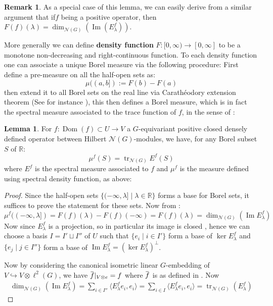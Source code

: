 \documentclass[11pt]{report}
\theoremstyle{definition}
\newtheorem{Lemma}[Def]{Lemma}
\newtheorem{Rmk}{Remark}[chapter]
\theoremstyle{plain}
\DeclareMathOperator{\tr}{tr}
\DeclareMathOperator{\im}{Im}
\DeclareMathOperator{\dom}{Dom}
\newcommand{\real}{\mathbb{R}}
\newcommand{\inj}{\hookrightarrow}
\newcommand{\vna}{\mathcal{N}}
\newcommand{\overbar}[1]{\mkern 1.5mu\overline{\mkern-1.5mu#1\mkern-1.5mu}\mkern 1.5mu}
\newcommand{\brac}[1]{\langle #1 \rangle}
\renewcommand{\bar}{\overbar}
\begin{document}
\begin{Rmk}
	As a special case of this lemma, we can easily derive from a similar argument that if$f$ being a positive operator, then $F(f)(\lambda)=\dim_{\vna(G)}(\im (E^{f}_{\lambda}))$.
\end{Rmk}
More generally we can define \textbf{density function} $F:[0, \infty)\to [0, \infty]$ to be a monotone non-decreasing and right-continuous function. To each density function one can associate a unique Borel measure via the following procedure: First define a pre-measure on all the half-open sets as:
\begin{equation*}
\mu((a,b]):=F(b)-F(a)
\end{equation*}
then extend it to all Borel sets on the real line via Carath\'eodory extension theorem (See for instance \cite[Theorem~1.41]{klenke2013}), this then defines a Borel measure, which is in fact the spectral measure associated to the trace function of $f$, in the sense of :
\begin{Lemma}\label{F=dim}
	For $f:\dom(f)\subset U\to V$ a $G$-equivariant positive closed densely defined operator between Hilbert $\vna(G)$-modules, we have, for any Borel subset $S$ of $\real$:
	\begin{equation}
	\mu^f(S)=\tr_{\vna(G)}E^f(S)
	\end{equation}
	where $E^f$ is the spectral measure associated to $f$ and $\mu^f$ is the measure defined using spectral density function, as above:
\end{Lemma}
\begin{proof}
	Since the half-open sets $\{(-\infty, \lambda]\mid \lambda\in \real\}$ forms a base for Borel sets, it suffices to prove the statement for these sets. Now from :
	\begin{equation*}
	\mu^f((-\infty, \lambda])=F(f)(\lambda)-F(f)(-\infty)=F(f)(\lambda)=\dim_{\vna(G)}(\im E^f_\lambda)
	\end{equation*}
	Now since $E^f_\lambda$ is a projection, so in particular its image is closed \cite[Chapter~II, Proposition~3.2]{conway2013}, hence we can choose a basis $I=I'\sqcup I''$ of $U$ such that $\{e_i\mid i\in I'\}$ form a base of $\ker E^f_\lambda$ and $\{e_j\mid j\in I''\}$ form a base of $\im E^f_\lambda=(\ker E^f_\lambda)^\perp$.
	\par Now by considering the canonical isometric linear $G$-embedding of $V\inj V\otimes \ell^2(G)$, we have $\bar{f}|_{V\otimes e}=f$ where $\bar{f}$ is as defined in . Now
	\begin{equation}
	\begin{split}
	\dim_{\vna(G)}(\im E_\lambda^f)=\sum_{i\in I''}\brac{E^f_\lambda e_i, e_i}=\sum_{i\in I}\brac{E^f_\lambda e_i, e_i}=\tr_{\vna(G)}(E^f_\lambda)
	\end{split}
	\end{equation}
\end{proof}
\end{document}
